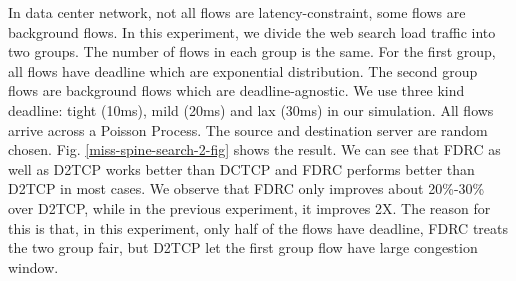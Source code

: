 \documentclass[10pt, conference, letterpaper]{IEEEtran}
\begin{document}
\begin{figure*}[!htb]
\centering
{}
\caption{Deadline missing comparison between FDRC and LPD, D2TCP, DCTCP under data mining workload.  Flows' deadline have uniform distribution between 10ms and 30ms }
\label{miss-spine-data-fig}
\end{figure*}



\begin{figure*}[!htb]
\centering
{}
\caption{Web Search workload of deadline missing comparison between FDRC and D2TCP, DCTCP. Note, in this experiment, deadline has exponential distribution and only half of the flows have deadline. }
\label{miss-spine-search-2-fig}
\end{figure*}



In data center network, not all flows are latency-constraint, some flows are background flows. In this experiment, we divide the web
search load traffic into two groups. The number of flows in each group is the same. 
For the first group, all flows have deadline which are exponential distribution.
The second group flows are background flows which are deadline-agnostic. 
We use three kind deadline:
tight (10ms), mild (20ms) and lax (30ms) \cite{D3} in our simulation. 
All flows arrive across a Poisson Process. The source and destination server are random chosen. Fig. \ref{miss-spine-search-2-fig} shows
the result. We can see that  FDRC as well as D2TCP works better than DCTCP and FDRC performs better than D2TCP in most cases. 
We observe that FDRC only improves about 20\%-30\% over D2TCP, while in the previous experiment, it improves 2X. The reason for
this is that, in this experiment, only half of the flows have deadline, FDRC treats the two group fair, but D2TCP let the first group flow have large congestion window.
\end{document}
